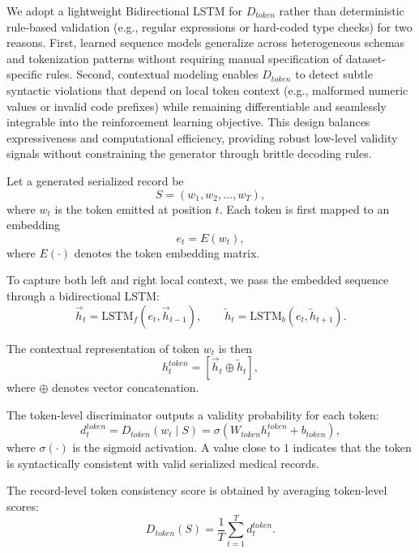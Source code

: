We adopt a lightweight Bidirectional LSTM for $D_{token}$ rather than deterministic rule-based validation (e.g., regular expressions or hard-coded type checks) for two reasons. First, learned sequence models generalize across heterogeneous schemas and tokenization patterns without requiring manual specification of dataset-specific rules. Second, contextual modeling enables $D_{token}$ to detect subtle syntactic violations that depend on local token context (e.g., malformed numeric values or invalid code prefixes) while remaining differentiable and seamlessly integrable into the reinforcement learning objective. This design balances expressiveness and computational efficiency, providing robust low-level validity signals without constraining the generator through brittle decoding rules.

Let a generated serialized record be
\begin{equation}
S=(w_1,w_2,\ldots,w_T),
\end{equation}
where $w_t$ is the token emitted at position $t$. Each token is first mapped to an embedding
\begin{equation}
e_t = E(w_t),
\end{equation}
where $E(\cdot)$ denotes the token embedding matrix.

To capture both left and right local context, we pass the embedded sequence through a bidirectional LSTM:
\begin{equation}
\overrightarrow{h}_t = \mathrm{LSTM}_{f}(e_t,\overrightarrow{h}_{t-1}),
\qquad
\overleftarrow{h}_t = \mathrm{LSTM}_{b}(e_t,\overleftarrow{h}_{t+1}).
\end{equation}

The contextual representation of token $w_t$ is then
\begin{equation}
h_t^{token} = [\overrightarrow{h}_t \oplus \overleftarrow{h}_t],
\end{equation}
where $\oplus$ denotes vector concatenation.

The token-level discriminator outputs a validity probability for each token:
\begin{equation}
d_t^{token}
=
D_{token}(w_t \mid S)
=
\sigma
\left(
W_{token} h_t^{token} + b_{token}
\right),
\end{equation}
where $\sigma(\cdot)$ is the sigmoid activation. A value close to $1$ indicates that the token is syntactically consistent with valid serialized medical records.

The record-level token consistency score is obtained by averaging token-level scores:
\begin{equation}
D_{token}(S)
=
\frac{1}{T}
\sum_{t=1}^{T}
d_t^{token}.
\end{equation}

